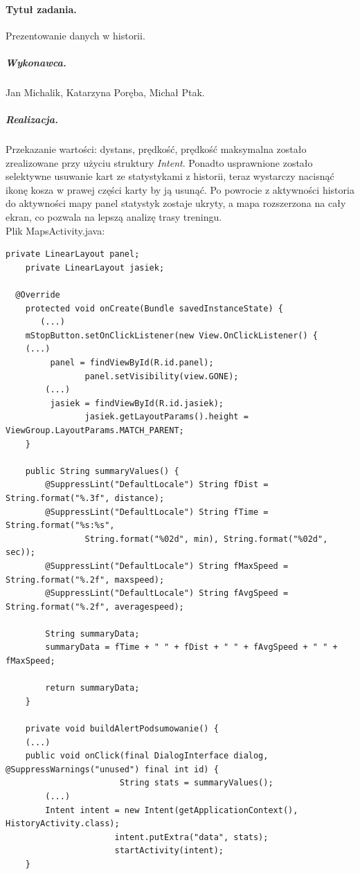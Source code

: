 \documentclass[a4paper]{article}
\begin{document}
\paragraph{Tytuł zadania.} Prezentowanie danych w historii.
\subparagraph{Wykonawca.} Jan Michalik, Katarzyna Poręba, Michał Ptak.
\subparagraph{Realizacja.} Przekazanie wartości: dystans, prędkość, prędkość maksymalna zostało zrealizowane przy użyciu struktury \emph{Intent}. Ponadto usprawnione zostało selektywne usuwanie kart ze statystykami z historii, teraz wystarczy nacisnąć ikonę kosza w prawej części karty by ją usunąć. Po powrocie z aktywności historia do aktywności mapy panel statystyk zostaje ukryty, a mapa rozszerzona na cały ekran, co pozwala na lepszą analizę trasy treningu.\\
Plik MapsActivity.java:
\begin{lstlisting}[style=java]
    private LinearLayout panel;
    private LinearLayout jasiek;

  @Override
    protected void onCreate(Bundle savedInstanceState) {
       (...)
	mStopButton.setOnClickListener(new View.OnClickListener() {
	(...)
	     panel = findViewById(R.id.panel);
                panel.setVisibility(view.GONE);
	    (...)
	     jasiek = findViewById(R.id.jasiek);
                jasiek.getLayoutParams().height =  ViewGroup.LayoutParams.MATCH_PARENT;
	}

    public String summaryValues() {
        @SuppressLint("DefaultLocale") String fDist = String.format("%.3f", distance);
        @SuppressLint("DefaultLocale") String fTime = String.format("%s:%s",
                String.format("%02d", min), String.format("%02d", sec));
        @SuppressLint("DefaultLocale") String fMaxSpeed = String.format("%.2f", maxspeed);
        @SuppressLint("DefaultLocale") String fAvgSpeed = String.format("%.2f", averagespeed);

        String summaryData;
        summaryData = fTime + " " + fDist + " " + fAvgSpeed + " " + fMaxSpeed;

        return summaryData;
    }

    private void buildAlertPodsumowanie() {
	(...)
	public void onClick(final DialogInterface dialog, @SuppressWarnings("unused") final int id) {
                       String stats = summaryValues();
		(...)
		Intent intent = new Intent(getApplicationContext(), HistoryActivity.class);
                      intent.putExtra("data", stats);
                      startActivity(intent);
	}
\end{lstlisting}
\end{document}
